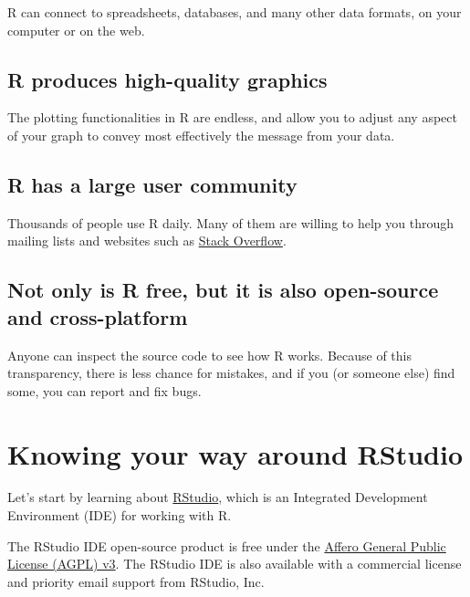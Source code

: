 \documentclass[
]{book}
\begin{document}
R can connect to spreadsheets, databases, and many other data formats, on your
computer or on the web.

\hypertarget{r-produces-high-quality-graphics}{%
\subsection{R produces high-quality graphics}\label{r-produces-high-quality-graphics}}

The plotting functionalities in R are endless, and allow you to adjust any
aspect of your graph to convey most effectively the message from your data.

\hypertarget{r-has-a-large-user-community}{%
\subsection{R has a large user community}\label{r-has-a-large-user-community}}

Thousands of people use R daily. Many of them are willing to help you through
mailing lists and websites such as \href{https://stackoverflow.com/questions/tagged/r}{Stack Overflow}.

\hypertarget{not-only-is-r-free-but-it-is-also-open-source-and-cross-platform}{%
\subsection{Not only is R free, but it is also open-source and cross-platform}\label{not-only-is-r-free-but-it-is-also-open-source-and-cross-platform}}

Anyone can inspect the source code to see how R works. Because of this
transparency, there is less chance for mistakes, and if you (or someone else)
find some, you can report and fix bugs.

\hypertarget{knowing-your-way-around-rstudio}{%
\section{Knowing your way around RStudio}\label{knowing-your-way-around-rstudio}}

Let's start by learning about \href{https://www.rstudio.com/}{RStudio}, which is an
Integrated Development Environment (IDE) for working with R.

The RStudio IDE open-source product is free under the
\href{https://www.gnu.org/licenses/agpl-3.0.en.html}{Affero General Public License (AGPL) v3}.
The RStudio IDE is also available with a commercial license and priority email
support from RStudio, Inc.
\end{document}
